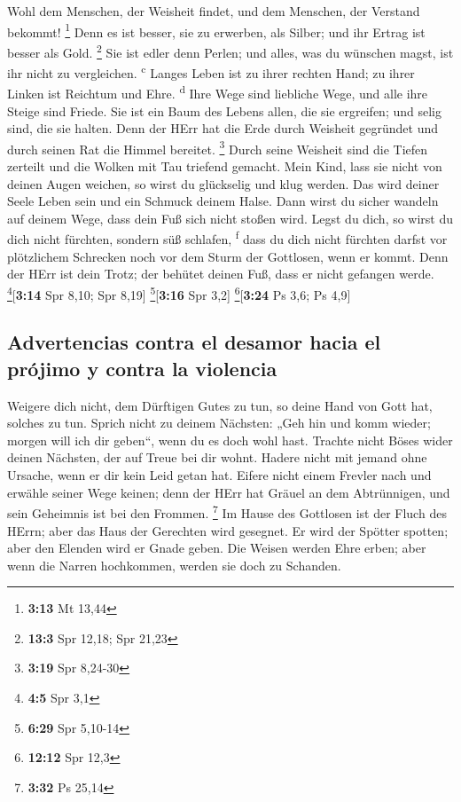  Wohl dem Menschen, der Weisheit findet, und dem
Menschen, der Verstand bekommt! \footnote{\textbf{3:13} Mt 13,44}
 Denn es ist besser, sie zu erwerben, als Silber; und ihr
Ertrag ist besser als Gold. \footnote{\textbf{13:3} Spr 12,18; Spr 21,23}
 Sie ist edler denn Perlen; und alles, was du wünschen
magst, ist ihr nicht zu vergleichen. \textsuperscript{c} 
Langes Leben ist zu ihrer rechten Hand; zu ihrer Linken ist Reichtum und
Ehre. \textsuperscript{d}  Ihre Wege sind liebliche Wege,
und alle ihre Steige sind Friede.  Sie ist ein Baum des
Lebens allen, die sie ergreifen; und selig sind, die sie halten.
 Denn der HErr hat die Erde durch Weisheit gegründet und
durch seinen Rat die Himmel bereitet. \footnote{\textbf{3:19} Spr
  8,24-30}  Durch seine Weisheit sind die Tiefen zerteilt
und die Wolken mit Tau triefend gemacht.  Mein Kind, lass
sie nicht von deinen Augen weichen, so wirst du glückselig und klug
werden.  Das wird deiner Seele Leben sein und ein Schmuck
deinem Halse.  Dann wirst du sicher wandeln auf deinem
Wege, dass dein Fuß sich nicht stoßen wird.  Legst du
dich, so wirst du dich nicht fürchten, sondern süß schlafen,
\textsuperscript{f}  dass du dich nicht fürchten darfst
vor plötzlichem Schrecken noch vor dem Sturm der Gottlosen, wenn er
kommt.  Denn der HErr ist dein Trotz; der behütet deinen
Fuß, dass er nicht gefangen werde. \footnote{\textbf{4:5} Spr 3,1}{[}\textbf{3:14}
Spr 8,10; Spr 8,19{]} \footnote{\textbf{6:29} Spr 5,10-14}{[}\textbf{3:16}
Spr 3,2{]} \footnote{\textbf{12:12} Spr 12,3}{[}\textbf{3:24} Ps 3,6; Ps
4,9{]}

\hypertarget{advertencias-contra-el-desamor-hacia-el-pruxf3jimo-y-contra-la-violencia}{%
\subsection{Advertencias contra el desamor hacia el prójimo y contra la
violencia}\label{advertencias-contra-el-desamor-hacia-el-pruxf3jimo-y-contra-la-violencia}}

 Weigere dich nicht, dem Dürftigen Gutes zu tun, so deine
Hand von Gott hat, solches zu tun.  Sprich nicht zu
deinem Nächsten: „Geh hin und komm wieder; morgen will ich dir geben``,
wenn du es doch wohl hast.  Trachte nicht Böses wider
deinen Nächsten, der auf Treue bei dir wohnt.  Hadere
nicht mit jemand ohne Ursache, wenn er dir kein Leid getan hat.
 Eifere nicht einem Frevler nach und erwähle seiner Wege
keinen;  denn der HErr hat Gräuel an dem Abtrünnigen, und
sein Geheimnis ist bei den Frommen. \footnote{\textbf{3:32} Ps 25,14}
 Im Hause des Gottlosen ist der Fluch des HErrn; aber das
Haus der Gerechten wird gesegnet.  Er wird der Spötter
spotten; aber den Elenden wird er Gnade geben.  Die
Weisen werden Ehre erben; aber wenn die Narren hochkommen, werden sie
doch zu Schanden.

